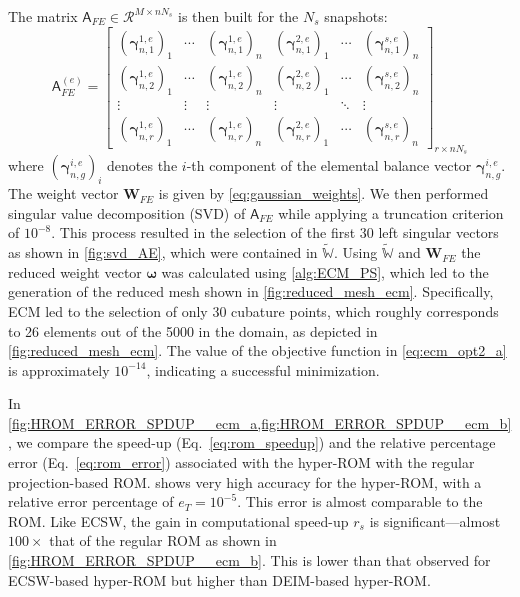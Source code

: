 \documentclass[11pt]{article}
\renewcommand{\vec}[1]{\mathbf{#1}}
\newcommand{\mat}[1]{\mathsf{#1}}
\begin{document}
            The matrix $\mat{A}_{FE}\in \mathcal{R}^{M\times n N_s}$ is then built for the $N_s$ snapshots:
            \begin{equation}
             \mat{A}_{FE}^{(e)} =
            \begin{bmatrix}
                \left(\boldsymbol{\gamma}^{1,e}_{n,1}\right)_1 & \cdots & \left(\boldsymbol{\gamma}^{1,e}_{n,1}\right)_n & \left(\boldsymbol{\gamma}^{2,e}_{n,1}\right)_1 &\cdots &\left(\boldsymbol{\gamma}^{s,e}_{n,1}\right)_n\\
                \left(\boldsymbol{\gamma}^{1,e}_{n,2}\right)_1 & \cdots & \left(\boldsymbol{\gamma}^{1,e}_{n,2}\right)_n & \left(\boldsymbol{\gamma}^{2,e}_{n,2}\right)_1 &\cdots &\left(\boldsymbol{\gamma}^{s,e}_{n,2}\right)_n\\
                \vdots & \vdots & \vdots & \vdots &\ddots & \vdots \\
                \left(\boldsymbol{\gamma}^{1,e}_{n,r}\right)_1 & \cdots & \left(\boldsymbol{\gamma}^{1,e}_{n,r}\right)_n & \left(\boldsymbol{\gamma}^{2,e}_{n,r}\right)_1 &\cdots &\left(\boldsymbol{\gamma}^{s,e}_{n,r}\right)_n
            \end{bmatrix}_{r \times n N_s}
            \end{equation}
            where $\left(\boldsymbol{\gamma}^{i,e}_{n,g}\right)_i$ denotes the $i$-th component of the elemental balance vector $\boldsymbol{\gamma}^{i,e}_{n,g}$.
            The weight vector $\vec{W}_{FE}$ is given by \cref{eq:gaussian_weights}.
            We then performed singular value decomposition (SVD) of \(\mat{A}_{FE}\) while applying a truncation criterion of \(10^{-8}\).
            This process resulted in the selection of the first 30 left singular vectors as shown in \cref{fig:svd_AE}, which were contained in \(\widetilde{\mathbb{W}}\).
            Using $\widetilde{\mathbb{W}}$ and $\vec{W}_{FE}$ the reduced weight vector $\boldsymbol{\omega}$ was calculated using \cref{alg:ECM_PS}, which led to the generation of the reduced mesh shown in \cref{fig:reduced_mesh_ecm}.
            Specifically, ECM led to the selection of only 30 cubature points, which roughly corresponds to 26 elements out of the 5000 in the domain, as depicted in \cref{fig:reduced_mesh_ecm}.
            The value of the objective function in \cref{eq:ecm_opt2_a} is approximately $10^{-14}$, indicating a successful minimization.


            In \cref{fig:HROM_ERROR_SPDUP__ecm_a,fig:HROM_ERROR_SPDUP__ecm_b}, we compare the speed-up (Eq.~\ref{eq:rom_speedup}) and the relative percentage error (Eq.~\ref{eq:rom_error}) associated with the hyper-ROM with the regular projection-based ROM.
             shows very high accuracy for the hyper-ROM, with a relative error percentage of $e_T = 10^{-5}$.
            This error is almost comparable to the ROM.
            Like ECSW, the gain in computational speed-up $r_s$ is significant—almost $100\times$ that of the regular ROM as shown in \cref{fig:HROM_ERROR_SPDUP__ecm_b}.
            This is lower than that observed for ECSW-based hyper-ROM but higher than DEIM-based hyper-ROM.
\end{document}
